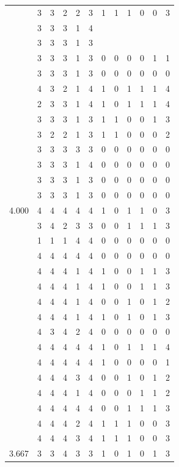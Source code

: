 \documentclass[]{msu-thesis}
\theoremstyle{definition}
\theoremstyle{definition}
\theoremstyle{definition}
\theoremstyle{remark}
\begin{document}
\begin{table}
{\begin{tabular}[t]{rrrrrrrrrrrr}
 & 3 & 3 & 2 & 2 & 3 & 1 & 1 & 1 & 0 & 0 & 3\\
 & 3 & 3 & 3 & 1 & 4 &  &  &  &  &  & \\
 & 3 & 3 & 3 & 1 & 3 &  &  &  &  &  & \\
 & 3 & 3 & 3 & 1 & 3 & 0 & 0 & 0 & 0 & 1 & 1\\
 & 3 & 3 & 3 & 1 & 3 & 0 & 0 & 0 & 0 & 0 & 0\\
 & 4 & 3 & 2 & 1 & 4 & 1 & 0 & 1 & 1 & 1 & 4\\
 & 2 & 3 & 3 & 1 & 4 & 1 & 0 & 1 & 1 & 1 & 4\\
 & 3 & 3 & 3 & 1 & 3 & 1 & 1 & 0 & 0 & 1 & 3\\
 & 3 & 2 & 2 & 1 & 3 & 1 & 1 & 0 & 0 & 0 & 2\\
 & 3 & 3 & 3 & 3 & 3 & 0 & 0 & 0 & 0 & 0 & 0\\
 & 3 & 3 & 3 & 1 & 4 & 0 & 0 & 0 & 0 & 0 & 0\\
 & 3 & 3 & 3 & 1 & 3 & 0 & 0 & 0 & 0 & 0 & 0\\
 & 3 & 3 & 3 & 1 & 3 & 0 & 0 & 0 & 0 & 0 & 0\\
4.000 & 4 & 4 & 4 & 4 & 4 & 1 & 0 & 1 & 1 & 0 & 3\\
 & 3 & 4 & 2 & 3 & 3 & 0 & 0 & 1 & 1 & 1 & 3\\
 & 1 & 1 & 1 & 4 & 4 & 0 & 0 & 0 & 0 & 0 & 0\\
 & 4 & 4 & 4 & 4 & 4 & 0 & 0 & 0 & 0 & 0 & 0\\
 & 4 & 4 & 4 & 1 & 4 & 1 & 0 & 0 & 1 & 1 & 3\\
 & 4 & 4 & 4 & 1 & 4 & 1 & 0 & 0 & 1 & 1 & 3\\
 & 4 & 4 & 4 & 1 & 4 & 0 & 0 & 1 & 0 & 1 & 2\\
 & 4 & 4 & 4 & 1 & 4 & 1 & 0 & 1 & 0 & 1 & 3\\
 & 4 & 3 & 4 & 2 & 4 & 0 & 0 & 0 & 0 & 0 & 0\\
 & 4 & 4 & 4 & 4 & 4 & 1 & 0 & 1 & 1 & 1 & 4\\
 & 4 & 4 & 4 & 4 & 4 & 1 & 0 & 0 & 0 & 0 & 1\\
 & 4 & 4 & 4 & 3 & 4 & 0 & 0 & 1 & 0 & 1 & 2\\
 & 4 & 4 & 4 & 1 & 4 & 0 & 0 & 0 & 1 & 1 & 2\\
 & 4 & 4 & 4 & 4 & 4 & 0 & 0 & 1 & 1 & 1 & 3\\
 & 4 & 4 & 4 & 2 & 4 & 1 & 1 & 1 & 0 & 0 & 3\\
 & 4 & 4 & 4 & 3 & 4 & 1 & 1 & 1 & 0 & 0 & 3\\
3.667 & 3 & 3 & 4 & 3 & 3 & 1 & 0 & 1 & 0 & 1 & 3\\

\end{tabular}}
\end{table}
\end{document}
